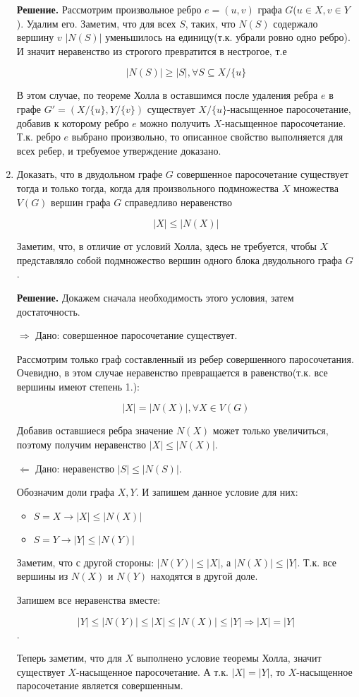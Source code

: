 \documentclass[fleqn]{article}
\begin{document}
\begin{enumerate}
	\textbf{Решение.} Рассмотрим произвольное ребро $e = (u, v)$ графа $G$($u\in X, v \in Y$). Удалим его. Заметим, что для всех $S$, таких, что $N(S)$ содержало вершину $v$ $|N(S)|$ уменьшилось на единицу(т.к. убрали ровно одно ребро). И значит неравенство из строгого превратится в нестрогое, т.е 
	
	$$|N(S)| \geqslant |S|, \forall S \subseteq X/\{u\}$$
	
	В этом случае, по теореме Холла в оставшимся после удаления ребра $e$ в графе $G' = (X / \{u\}, Y / \{v\})$ существует $X / \{u\}$-насыщенное паросочетание, добавив к которому ребро $e$ можно получить $X$-насыщенное паросочетание. Т.к. ребро $e$ выбрано произвольно, то описанное свойство выполняется для всех ребер, и требуемое утверждение доказано.
	
	\item Доказать, что в двудольном графе $G$ совершенное паросочетание существует тогда и только тогда,
	когда для произвольного подмножества $X$ множества $V(G)$ вершин графа $G$ справедливо неравенство
	
	$$|X| \leqslant |N(X)|$$
	
	Заметим, что, в отличие от условий Холла, здесь не требуется, чтобы $X$ представляло собой
	подмножество вершин одного блока двудольного графа $G$.
	
	\textbf{Решение.}
	Докажем сначала необходимость этого условия, затем достаточность.
	
	$\Rightarrow$ Дано: совершенное паросочетание существует.
	
	Рассмотрим только граф составленный из ребер совершенного паросочетания. Очевидно, в этом случае неравенство превращается в равенство(т.к. все вершины имеют степень 1.): 
	
	$$|X| = |N(X)|, \forall X \in V(G)$$ 
	
	Добавив оставшиеся ребра значение $N(X)$ может только увеличиться, поэтому получим неравенство $|X| \leqslant |N(X)|$.
	
	$\Leftarrow$ Дано: неравенство $|S| \leqslant |N(S)|$.
	
	Обозначим доли графа $X,Y$. И запишем данное условие для них:
	
	\begin{itemize}
		\item $S = X \rightarrow |X| \leqslant |N(X)|$
		\item $S = Y \rightarrow |Y| \leqslant |N(Y)|$
	\end{itemize}
	
	Заметим, что с другой стороны: $|N(Y)| \leqslant |X|$, а $|N(X)| \leqslant |Y|$. Т.к. все вершины из $N(X)$ и $N(Y)$ находятся в другой доле.
	
	Запишем все неравенства вместе:
	
	$$|Y| \leqslant |N(Y)| \leqslant |X| \leqslant |N(X)| \leqslant |Y| \Rightarrow |X| = |Y|$$.

	Теперь заметим, что для $X$ выполнено условие теоремы Холла, значит существует $X$-насыщенное паросочетание. А т.к. $|X| = |Y|$, то $X$-насыщенное паросочетание является совершенным.
	\end{enumerate}
	
	
\end{document}
